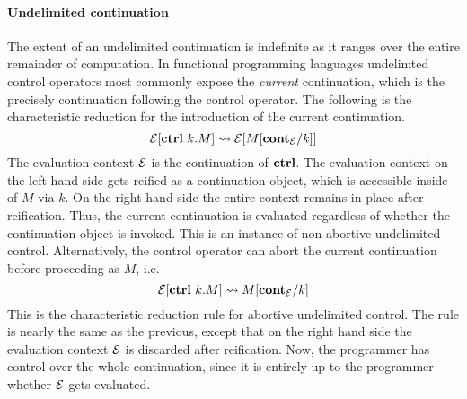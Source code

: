 \documentclass[12pt,phd,lfcs,twoside,openright,logo,leftchapter,normalheadings]{infthesis}
\theoremstyle{plain}
\theoremstyle{definition}
\begin{document}
\paragraph{Undelimited continuation} The extent of an undelimited
continuation is indefinite as it ranges over the entire remainder of
computation.
%
In functional programming languages undelimted control operators most
commonly expose the \emph{current} continuation, which is the
precisely continuation following the control operator. The following
is the characteristic reduction for the introduction of the current
continuation.
%
\[
  \mathcal{E}[\mathbf{ctrl}~k.M] \leadsto \mathcal{E}[M[\mathbf{cont}_{\mathcal{E}}/k]]
\]
%
The evaluation context $\mathcal{E}$ is the continuation of $\mathbf{ctrl}$. The
evaluation context on the left hand side gets reified as a
continuation object, which is accessible inside of $M$ via $k$. On the
right hand side the entire context remains in place after
reification. Thus, the current continuation is evaluated regardless of
whether the continuation object is invoked.  This is an instance of
non-abortive undelimited control. Alternatively, the control operator
can abort the current continuation before proceeding as $M$, i.e.
%
\[
  \mathcal{E}[\mathbf{ctrl}~k.M] \leadsto M[\mathbf{cont}_{\mathcal{E}}/k]
\]
%
This is the characteristic reduction rule for abortive undelimited
control. The rule is nearly the same as the previous, except that on
the right hand side the evaluation context $\mathcal{E}$ is discarded after
reification. Now, the programmer has control over the whole
continuation, since it is entirely up to the programmer whether $\mathcal{E}$
gets evaluated.
\end{document}
